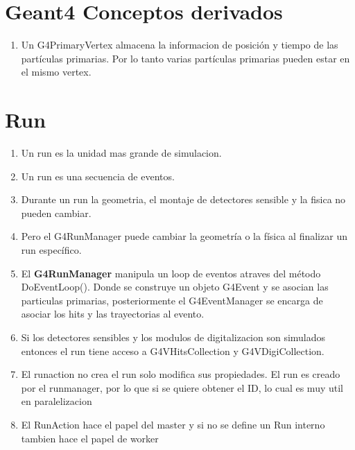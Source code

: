 \documentclass[10pt,a4paper,oneside]{book}
\begin{document}
\section*{Geant4 Conceptos derivados}
\begin{enumerate}
\item Un G4PrimaryVertex almacena la informacion de posición y tiempo
  de las partículas primarias. Por lo tanto varias partículas
  primarias pueden estar en el mismo vertex.
\end{enumerate}

\section*{Run}
\begin{enumerate}
\item Un run es la unidad mas grande de simulacion.
\item Un run es una secuencia de eventos.
\item Durante un run la geometria, el montaje de detectores sensible y
  la fisica no pueden cambiar.
\item Pero el G4RunManager puede cambiar la geometría o la física al
  finalizar un run específico.
\item El \textbf{G4RunManager} manipula un loop de eventos atraves del método
  DoEventLoop(). Donde se construye un objeto G4Event y se asocian las
  particulas primarias, posteriormente el G4EventManager se encarga de
  asociar los hits y las trayectorias al evento.
\item Si los detectores sensibles y los modulos de digitalizacion son
  simulados entonces el run tiene acceso a G4VHitsCollection y
  G4VDigiCollection.
\item El runaction no crea el run solo modifica sus propiedades. El
  run es creado por el runmanager, por lo que si se quiere obtener el
  ID, lo cual es muy util en paralelizacion
\item El RunAction hace el papel del master y si no se define un Run
  interno tambien hace el papel de worker
\end{enumerate}
\end{document}
